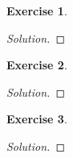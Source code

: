 \documentclass[12pt,a4]{article}
\theoremstyle{definition}
\newtheorem{exercise}{Exercise}
\begin{document}
\begin{exercise}
	
\end{exercise}
\begin{proof}[Solution]
	
\end{proof}

\begin{exercise}
	
\end{exercise}
\begin{proof}[Solution]
	
\end{proof}

\begin{exercise}
	
\end{exercise}
\begin{proof}[Solution]
	
\end{proof}
\end{document}
